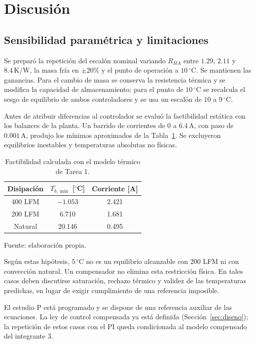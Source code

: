 \section{Discusión}\label{sec:discusion}
\subsection{Sensibilidad paramétrica y limitaciones}\label{sec:sensibilidad}
Se preparó la repetición del escalón nominal variando $R_{HA}$ entre $1.29$, $2.11$ y $8.4\,\mathrm{K/W}$, la masa fría en $\pm20\%$ y el punto de operación a $10\,{}^\circ\mathrm C$. Se mantienen las ganancias. Para el cambio de masa se conserva la resistencia térmica y se modifica la capacidad de almacenamiento; para el punto de $10\,{}^\circ\mathrm C$ se recalcula el sesgo de equilibrio de ambos controladores y se usa un escalón de $10$ a $9\,{}^\circ\mathrm C$.

Antes de atribuir diferencias al controlador se evaluó la factibilidad estática con los balances de la planta. Un barrido de corrientes de $0$ a $6.4\,\mathrm A$, con paso de $0.001\,\mathrm A$, produjo los mínimos aproximados de la Tabla~\ref{tab:factibilidad}. Se excluyeron equilibrios inestables y temperaturas absolutas no físicas.

\begin{table}[!tbp]\centering
\caption{Factibilidad calculada con el modelo térmico de Tarea 1.}
\label{tab:factibilidad}
\footnotesize
\begin{tabular}{@{}ccc@{}}\toprule
Disipación&$T_{b,\min}$ [$^\circ$C]&Corriente [A]\\\midrule
400 LFM&$-1.053$&2.421\\
200 LFM&6.710&1.681\\
Natural&20.146&0.495\\\bottomrule
\end{tabular}
\par\smallskip\footnotesize Fuente: elaboración propia.
\end{table}
Según estas hipótesis, $5\,{}^\circ\mathrm C$ no es un equilibrio alcanzable con 200 LFM ni con convección natural. Un compensador no elimina esta restricción física. En tales casos deben discutirse saturación, rechazo térmico y validez de las temperaturas predichas, en lugar de exigir cumplimiento de una referencia imposible.

El estudio P está programado y se dispone de una referencia auxiliar de las ecuaciones. La ley de control compensada ya está definida (Sección~\ref{sec:diseno}); la repetición de estos casos con el PI queda condicionada al modelo compensado del integrante 3. 

